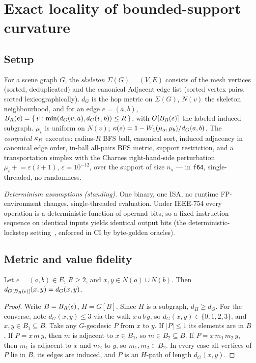 \section{Exact locality of bounded-support curvature}\label{sec:theory}

\subsection{Setup}

For a scene graph $G$, the \emph{skeleton} $\Sigma(G)=(V,E)$ consists of the
mesh vertices (sorted, deduplicated) and the canonical \textsf{Adjacent}
edge list (sorted vertex pairs, sorted lexicographically). $d_G$ is the hop
metric on $\Sigma(G)$, $N(v)$ the skeleton neighbourhood, and for an edge
$e=(a,b)$,
$B_{R}(e) = \{\, v : \min(d_G(v,a), d_G(v,b)) \le R \,\}$, with
$G[B_{R}(e)]$ the labeled induced subgraph. $\mu_v$ is uniform on
$N(v)$; $\kappa(e) = 1 - W_{1}(\mu_a,\mu_b)/d_G(a,b)$. The \emph{computed}
$\kappa_R$ executes: radius-$R$ BFS ball, canonical sort, induced adjacency in
canonical edge order, in-ball all-pairs BFS metric, support restriction, and
a transportation simplex with the Charnes right-hand-side perturbation
$\mu_i \mathrel{+}= \varepsilon (i{+}1)$, $\varepsilon = 10^{-12}$, over the
support of size $n_s$ --- in \texttt{f64}, single-threaded, no randomness.

\emph{Determinism assumptions (standing).} One binary, one ISA, no runtime
FP-environment changes, single-threaded evaluation. Under IEEE-754 every
operation is a deterministic function of operand bits, so a fixed
instruction sequence on identical inputs yields identical output bits (the
deterministic-lockstep setting~\cite{fiedler2010floating}, enforced in CI
by byte-golden oracles).

\subsection{Metric and value fidelity}

\begin{lemma}\label{lem:metric}
Let $e=(a,b) \in E$, $R \ge 2$, and $x,y \in N(a) \cup N(b)$. Then
$d_{G[B_{R}(e)]}(x,y) = d_G(x,y)$.
\end{lemma}

\begin{proof}
Write $B = B_{R}(e)$, $H = G[B]$. Since $H$ is a subgraph, $d_H \ge d_G$.
For the converse, note $d_G(x,y) \le 3$ via the walk $x\,a\,b\,y$, so
$d_G(x,y) \in \{0,1,2,3\}$, and $x,y \in B_1 \subseteq B$. Take any
$G$-geodesic $P$ from $x$ to $y$. If $|P| \le 1$ its elements are in $B$.
If $P = x\,m\,y$, then $m$ is adjacent to $x \in B_1$, so $m \in B_2
\subseteq B$. If $P = x\,m_1\,m_2\,y$, then $m_1$ is adjacent to $x$ and
$m_2$ to $y$, so $m_1, m_2 \in B_2$. In every case all vertices of $P$ lie
in $B$, its edges are induced, and $P$ is an $H$-path of length $d_G(x,y)$.
\end{proof}


